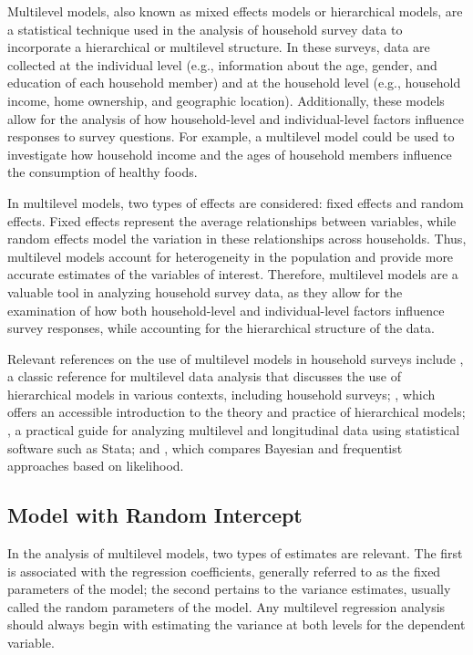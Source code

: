 \documentclass[
  12pt,
]{book}
\begin{document}
Multilevel models, also known as mixed effects models or hierarchical models, are a statistical technique used in the analysis of household survey data to incorporate a hierarchical or multilevel structure. In these surveys, data are collected at the individual level (e.g., information about the age, gender, and education of each household member) and at the household level (e.g., household income, home ownership, and geographic location). Additionally, these models allow for the analysis of how household-level and individual-level factors influence responses to survey questions. For example, a multilevel model could be used to investigate how household income and the ages of household members influence the consumption of healthy foods.

In multilevel models, two types of effects are considered: fixed effects and random effects. Fixed effects represent the average relationships between variables, while random effects model the variation in these relationships across households. Thus, multilevel models account for heterogeneity in the population and provide more accurate estimates of the variables of interest. Therefore, multilevel models are a valuable tool in analyzing household survey data, as they allow for the examination of how both household-level and individual-level factors influence survey responses, while accounting for the hierarchical structure of the data.

Relevant references on the use of multilevel models in household surveys include \citet{goldstein2011}, a classic reference for multilevel data analysis that discusses the use of hierarchical models in various contexts, including household surveys; \citet{gelmanhill2019}, which offers an accessible introduction to the theory and practice of hierarchical models; \citet{rabe2012multilevel}, a practical guide for analyzing multilevel and longitudinal data using statistical software such as Stata; and \citet{browne2006comparison}, which compares Bayesian and frequentist approaches based on likelihood.

\hypertarget{model-with-random-intercept}{%
\subsection{Model with Random Intercept}\label{model-with-random-intercept}}

In the analysis of multilevel models, two types of estimates are relevant. The first is associated with the regression coefficients, generally referred to as the fixed parameters of the model; the second pertains to the variance estimates, usually called the random parameters of the model. Any multilevel regression analysis should always begin with estimating the variance at both levels for the dependent variable.
\end{document}
